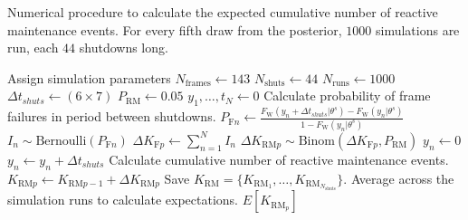 \begin{algorithm}
	\caption{Numerical procedure to calculate the expected cumulative number of reactive maintenance events. For every fifth draw from the posterior, $1000$ simulations are run, each $44$ shutdowns long.}
  \label{algo:K_RM}
	\begin{algorithmic}[1]
    \State Assign simulation parameters
    \State $N_{\text{frames}} \gets 143$         
    \State $N_{\text{shuts}} \gets 44$           
    \State $N_{\text{runs}} \gets 1000$          
    \State $\Delta t_{shuts} \gets (6 \times 7)$ 
    \State $P_{\text{RM}} \gets 0.05$            
    \State
        \State $y_1, \dots, t_N \gets 0$         
          \State Calculate probability of frame failures in period between shutdowns.
          \State $P_{\text{F} n} \gets \frac{F_{\text{W}}(y_n + \Delta t_{shuts} | \theta^s) - F_{\text{W}}(y_n | \theta^s)}{1 - F_{\text{W}}(y_n | \theta^s)}$
          \State $I_n \sim \mbox{Bernoulli}(P_{\text{F} n})$   
          \State $\Delta K_{\text{F} p} \gets \sum^N_{n = 1} I_n$       
          \State $\Delta K_{\text{RM} p}\sim \mbox{Binom}(\Delta K_{\text{F} p}, P_{\text{RM}})$ 
              \State $y_n \gets 0$   
            \Else
              \State $y_n \gets y_n + \Delta t_{shuts}$   
            \EndIf
          \EndFor
          \State Calculate cumulative number of reactive maintenance events.
          \State $K_{\text{RM} p} \gets K_{\text{RM} p-1} + \Delta K_{\text{RM} p}$
        \EndFor
        \State Save $K_{\text{RM}} = \{K_{\text{RM}_1}, \dots, K_{\text{RM}_{N_{\text{shuts}}}}\}$.
      \EndFor
    \State Average across the simulation runs to calculate expectations.
    \State $E[K_{\text{RM}_p}]$
    \EndFor
	\end{algorithmic} 
\end{algorithm} 

